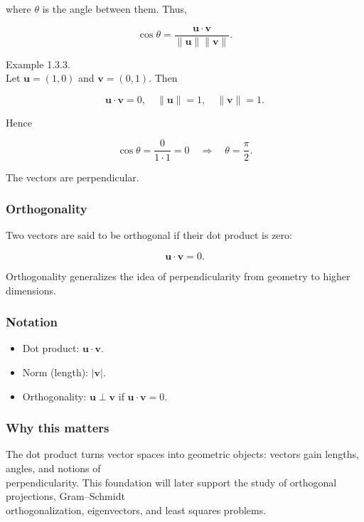 \documentclass[
  12pt,
  a4paper,
]{article}
\begin{document}
where \(\theta\) is the angle between them. Thus,

\[\cos \theta = \frac{\mathbf{u} \cdot \mathbf{v}}{\|\mathbf{u}\|\|\mathbf{v}\|}.\]

Example 1.3.3.\\
Let \(\mathbf{u} = (1,0)\) and \(\mathbf{v} = (0,1)\). Then

\[\mathbf{u} \cdot \mathbf{v} = 0, \quad \|\mathbf{u}\| = 1, \quad \|\mathbf{v}\| = 1.\]

Hence

\[\cos \theta = \frac{0}{1\cdot 1} = 0 \quad \Rightarrow \quad \theta = \frac{\pi}{2}.\]

The vectors are perpendicular.

\subsubsection{Orthogonality}\label{orthogonality}

Two vectors are said to be orthogonal if their dot product is zero:

\[\mathbf{u} \cdot \mathbf{v} = 0.\]

Orthogonality generalizes the idea of perpendicularity from geometry to
higher dimensions.

\subsubsection{Notation}\label{notation-3}

\begin{itemize}
\item
  Dot product: \(\mathbf{u} \cdot \mathbf{v}\).
\item
  Norm (length): \(|\mathbf{v}|\).
\item
  Orthogonality: \(\mathbf{u} \perp \mathbf{v}\) if
  \(\mathbf{u} \cdot \mathbf{v} = 0\).
\end{itemize}

\subsubsection{Why this matters}\label{why-this-matters-2}

The dot product turns vector spaces into geometric objects: vectors gain
lengths, angles, and notions of\\
perpendicularity. This foundation will later support the study of
orthogonal projections, Gram--Schmidt\\
orthogonalization, eigenvectors, and least squares problems.
\end{document}
